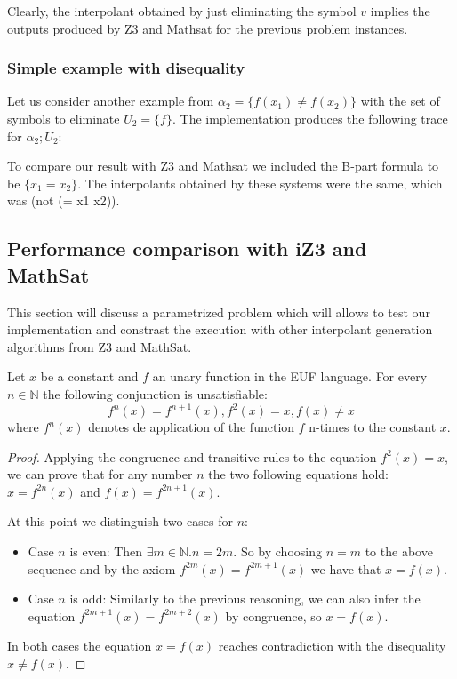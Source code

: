 Clearly, the interpolant obtained by just eliminating the symbol $v$ implies
the outputs produced by Z3 and Mathsat for the previous problem instances.

\subsubsection{Simple example with disequality}

Let us consider another example from \cite{KAPUR2017} 
$\alpha_2 = \{f(x_1) \neq f(x_2)\}$
with the set of symbols to eliminate $U_2 = \{f\}$. The implementation produces the following
trace for $\alpha_2; U_2$:



To compare our result with Z3 and Mathsat we 
included the B-part formula to be $\{x_1 = x_2\}$.
The interpolants obtained by these systems were the 
same, which was (not (= x1 x2)).

\subsection{Performance comparison with iZ3 and MathSat}\label{performance_euf}

This section will discuss a parametrized problem 
which will allows to test 
our implementation and constrast the execution with 
other interpolant generation
algorithms from Z3 and MathSat.

\begin{lemma} \label{performance_test_lemma}
  Let $x$ be a constant and $f$ an unary function in the EUF language. 
  For every $n \in \mathbb{N}$ the following conjunction is unsatisfiable:
  \begin{equation*}
    f^n(x) = f^{n+1}(x), f^2(x) = x, f(x) \neq x
  \end{equation*}
  where $f^n(x)$ denotes de application of the function $f$ n-times
  to the constant $x$.
\end{lemma}

\begin{proof}
  Applying the congruence and transitive rules to the equation $f^2(x) = x$, 
  we can prove that for any number $n$ the two following equations hold:
  $x = f^{2n}(x)$ and $f(x) = f^{2n+1}(x)$.

  At this point we distinguish two cases for $n$:

  \begin{itemize}
    \item Case $n$ is even: Then $\exists m \in \mathbb{N} . n = 2m$.
      So by choosing $n = m$ to the above sequence
      and by the axiom $f^{2m}(x) = f^{2m+1}(x)$ we have that
      $x = f(x)$.
    \item Case $n$ is odd: Similarly to the previous reasoning, 
      we can also infer the equation $f^{2m+1}(x) = f^{2m+2}(x)$
      by congruence, so $x = f(x)$.
    \end{itemize}

    In both cases the equation $x = f(x)$ reaches contradiction with the
    disequality $x \neq f(x)$.
\end{proof}

